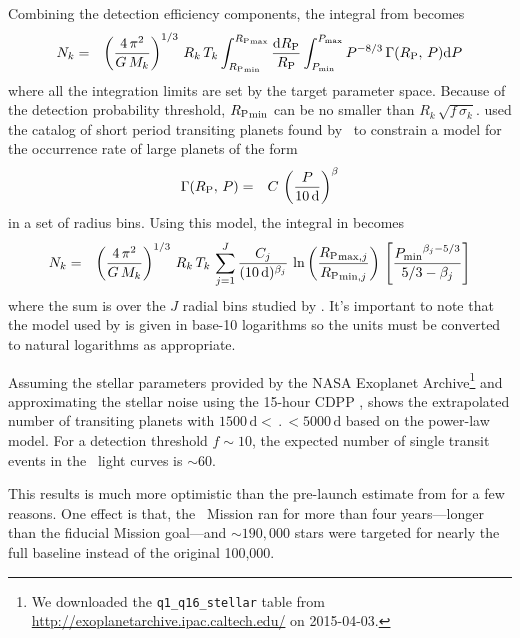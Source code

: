 Combining the detection efficiency components, the integral from 
becomes
\begin{eqnarray}\eqlabel{nk-2}
N_k &=& \left( \frac{4\,\pi^2}{G\,M_k} \right)^{1/3} \, R_k \, T_k
    \int_{\rp_\mathrm{min}} ^{\rp_\mathrm{max}} \frac{\dd\rp}{\rp}
    \int_{\period_\mathrm{min}} ^{\period_\mathrm{max}}
        \period^{-8/3}\,\rate(\rp,\,\period) \dd\period
\end{eqnarray}
where all the integration limits are set by the target parameter space.
Because of the detection probability threshold, ${R_\mathrm{P}}_\mathrm{min}$ can be no
smaller than $R_k\,\sqrt{f\,\sigma_k}$.
\citet{Dong:2013} used the catalog of short period transiting planets found
by \kepler\ to constrain a model for the occurrence rate of large planets of
the form
\begin{eqnarray}
{\ensuremath{\Gamma}}({R_\mathrm{P}},\,{P}) &=& C\,\left(\frac{{P}}{10\,\mathrm{d}}\right)^\beta
\end{eqnarray}
in a set of radius bins.
Using this model, the integral in  becomes
\begin{eqnarray}
N_k &=& \left( \frac{4\,\pi^2}{G\,M_k} \right)^{1/3} \, R_k \, T_k \,
    \sum_{j=1}^J \frac{C_j}{(10\,\mathrm{d})^{\beta_j}}\,
    \ln \left( \frac{{R_\mathrm{P}}_{\mathrm{max},j}}{{R_\mathrm{P}}_{\mathrm{min},j}} \right) \,
    \left[ \frac{{{P}_\mathrm{min}}^{\beta_j - 5/3}}{5/3-\beta_j} \right]
\end{eqnarray}
where the sum is over the $J$ radial bins studied by \citet{Dong:2013}.
It's important to note that the model used by \citet{Dong:2013} is given in
base-10 logarithms so the units must be converted to natural logarithms as
appropriate.

Assuming the stellar parameters provided by the NASA Exoplanet
Archive\footnote{We downloaded the \texttt{q1\_q16\_stellar} table from
\url{http://exoplanetarchive.ipac.caltech.edu/} on 2015-04-03.}
\citep{Huber:2014} and approximating the stellar noise using the 15-hour CDPP
\citep{Christiansen:2012},  shows the extrapolated number of
transiting planets with $1500\,\mathrm{d} < \period < 5000\,\mathrm{d}$ based
on the \citet{Dong:2013} power-law model.
For a detection threshold $f\sim10$, the expected number of single transit
events in the \kepler\ light curves is $\sim 60$.

This results is much more optimistic than the pre-launch estimate from
\citet{Yee:2008} for a few reasons.
One effect is that, the \kepler\ Mission ran for more than four
years---longer than the fiducial Mission goal---and $\sim190,000$ stars were
targeted for nearly the full baseline instead of the original 100,000.

